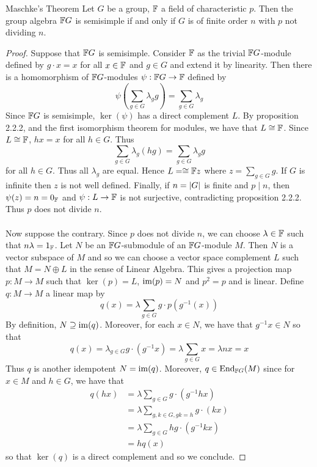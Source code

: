 \documentclass[a4paper]{article}
\begin{document}
\begin{thm}{Maschke's Theorem}{} Let $G$ be a group, $\mathbb{F}$ a field of characteristic $p$. Then the group algebra $\mathbb{F} G$ is semisimple if and only if $G$ is of finite order $n$ with $p$ not dividing $n$. \tcbline
\begin{proof}
Suppose that $\mathbb{F} G$ is semisimple. Consider $\mathbb{F}$ as the trivial $\mathbb{F} G$-module defined by $g\cdot x=x$ for all $x\in\mathbb{F}$ and $g\in G$ and extend it by linearity. Then there is a homomorphism of $\mathbb{F} G$-modules $\psi:\mathbb{F} G\to\mathbb{F}$ defined by $$\psi\left(\sum_{g\in G}\lambda_gg\right)=\sum_{g\in G}\lambda_g$$ Since $\mathbb{F} G$ is semisimple, $\ker(\psi)$ has a direct complement $L$. By proposition 2.2.2, and the first isomorphism theorem for modules, we have that $L\cong\mathbb{F}$. Since $L\cong\mathbb{F}$, $hx=x$ for all $h\in G$. Thus $$\sum_{g\in G}\lambda_g(hg)=\sum_{g\in G}\lambda_gg$$ for all $h\in G$. Thus all $\lambda_g$ are equal. Hence $L=\cong\mathbb{F} z$ where $z=\sum_{g\in G}g$. If $G$ is infinite then $z$ is not well defined. Finally, if $n=\abs{G}$ is finite and $p\;|\;n$, then $\psi(z)=n=0_{\mathbb{F}}$ and $\psi:L\to\mathbb{F}$ is not surjective, contradicting proposition 2.2.2. Thus $p$ does not divide $n$. \\~\\

Now suppose the contrary. Since $p$ does not divide $n$, we can choose $\lambda\in\mathbb{F}$ such that $n\lambda=1_{\mathbb{F}}$. Let $N$ be an $\mathbb{F} G$-submodule of an $\mathbb{F} G$-module $M$. Then $N$ is a vector subspace of $M$ and so we can choose a vector space complement $L$ such that $M=N\oplus L$ in the sense of Linear Algebra. This gives a projection map $p:M\to M$ such that $\ker(p)=L$, $\operatorname{im}(p)=N$ and $p^2=p$ and is linear. Define $q:M\to M$ a linear map by $$q(x)=\lambda\sum_{g\in G}g\cdot p(g^{-1}(x))$$ By definition, $N\supseteq\operatorname{im}(q)$. Moreover, for each $x\in N$, we have that $g^{-1}x\in N$ so that $$q(x)=\lambda_{g\in G}g\cdot(g^{-1}x)=\lambda\sum_{g\in G}x=\lambda nx=x$$ Thus $q$ is another idempotent $N=\operatorname{im}(q)$. Moreover, $q\in\text{End}_{\mathbb{F} G}(M)$ since for $x\in M$ and $h\in G$, we have that 
\begin{align*}
q(hx)&=\lambda\sum_{g\in G}g\cdot(g^{-1}hx)\\
&=\lambda\sum_{g,k\in G,gk=h}g\cdot(kx)\\
&=\lambda\sum_{g\in G}hg\cdot(g^{-1}kx)\\
&=hq(x)
\end{align*}
so that $\ker(q)$ is a direct complement and so we conclude. 
\end{proof}
\end{thm}
\end{document}
